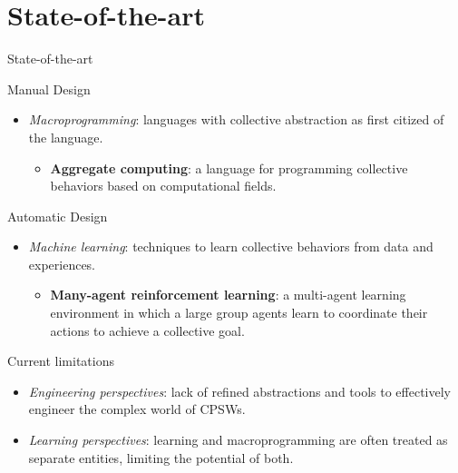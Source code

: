 \documentclass[presentation, 8pt,169]{beamer}\mode<presentation>{\usetheme{AMSBolognaFC}}
\begin{document}
\section{State-of-the-art}
\begin{frame}{State-of-the-art}
  \begin{exampleblock}{Manual Design}
    \begin{itemize}
    \item \emph{Macroprogramming}: languages with collective abstraction as first citized of the language.
    \begin{itemize}
      \item \textbf{Aggregate computing}: a language for programming collective behaviors based on computational fields.
    \end{itemize}
  \end{itemize}
  \end{exampleblock}
  \begin{exampleblock}{Automatic Design}
  \begin{itemize}
    \item \emph{Machine learning}: techniques to learn collective behaviors from data and experiences.
    \begin{itemize}
      \item \textbf{Many-agent reinforcement learning}: a multi-agent learning environment in which a large group agents learn to coordinate their actions to achieve a collective goal.
    \end{itemize}
  \end{itemize}
  \end{exampleblock}
  \begin{block}{Current limitations}
    \begin{itemize}
    \item \emph{Engineering perspectives}: lack of refined abstractions and tools to effectively engineer the complex world of CPSWs.
      \item \emph{Learning perspectives}: learning and macroprogramming are often treated as separate entities, limiting the potential of both.
    \end{itemize}
    \end{block}
\end{frame}
\end{document}
